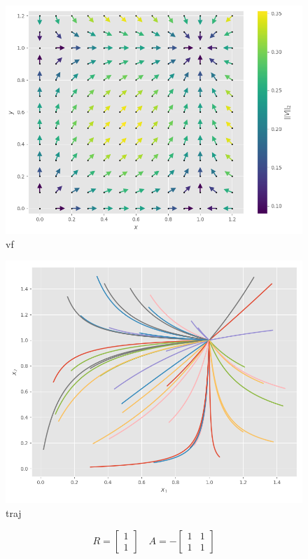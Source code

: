 \documentclass{wsdcr}
\begin{document}
\begin{figure}
    \centering
    \includegraphics[width=\linewidth]{fig/lv2_vfs0.png}
    \caption{vf}
    \label{fig:vfs0}
\end{figure}
\begin{figure}
    \centering
    \includegraphics[width=\linewidth]{fig/lv2_ts0.png}
    \caption{traj}
    \label{fig:ts0}
\end{figure}
\begin{equation}
R={\begin{bmatrix}1\\1\end{bmatrix}}\quad A =-{\begin{bmatrix}1&1\\1&1\end{bmatrix}}
\label{eq:RSnInv}
\end{equation}
\end{document}
